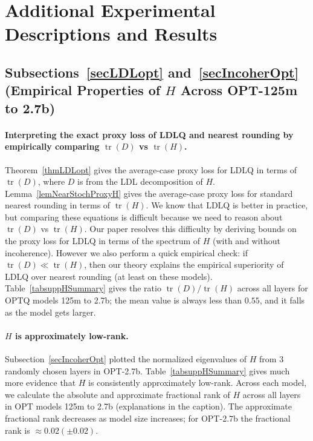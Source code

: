 \section{Additional Experimental Descriptions and Results}\label{suppAddResults}
\subsection{Subsections~\ref{secLDLopt} and~\ref{secIncoherOpt} (Empirical Properties of $H$ Across OPT-125m to 2.7b)}

\paragraph{Interpreting the exact proxy loss of LDLQ and nearest rounding by empirically comparing $\operatorname{tr}\left(D\right)$ vs $\operatorname{tr}\left(H\right)$.}
Theorem~\ref{thmLDLopt} gives the average-case proxy loss for LDLQ in terms of $\operatorname{tr}\left(D\right)$, where $D$ is from the LDL decomposition of $H$.
Lemma~\ref{lemNearStochProxyH} gives the average-case proxy loss for standard nearest rounding in terms of $\operatorname{tr}\left(H\right)$.
We know that LDLQ is better in practice, but comparing these equations is difficult because we need to reason about $\operatorname{tr}\left(D\right)$ vs $\operatorname{tr}\left(H\right)$.
Our paper resolves this difficulty by deriving bounds on the proxy loss for LDLQ in terms of the spectrum of $H$ (with and without incoherence). However we also perform a quick empirical check: if $\operatorname{tr}\left(D\right) \ll \operatorname{tr}\left(H\right)$, then our theory explains the empirical superiority of LDLQ over nearest rounding (at least on these models).
Table~\ref{tabsuppHSummary} gives the ratio $\operatorname{tr}\left(D\right) / \operatorname{tr}\left(H\right)$ across all layers for OPTQ models 125m to 2.7b; the mean value is always less than $0.55$, and it falls as the model gets larger. 

\paragraph{$H$ is approximately low-rank.}
Subsection~\ref{secIncoherOpt} plotted the normalized eigenvalues of $H$ from 3 randomly chosen layers in OPT-2.7b.
Table~\ref{tabsuppHSummary} gives much more evidence that $H$ is consistently approximately low-rank. Across each model, we calculate the absolute and approximate fractional rank of $H$ across all layers in OPT models 125m to 2.7b (explanations in the caption). The approximate fractional rank decreases as model size increases; for OPT-2.7b the fractional rank is $\approx 0.02 (\pm 0.02)$.

